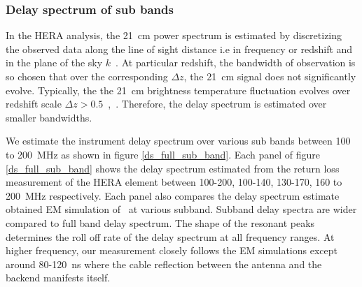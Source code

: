 \documentclass[twocolumn]{emulateapj}
\begin{document}
    \subsubsection{Delay spectrum of sub bands}
    \label{sub-band}
    In the HERA analysis, the 21~cm power spectrum
    is estimated by discretizing the observed data along the line of sight distance i.e
    in frequency or redshift and in the plane of the sky
    $k$~\citep{liu_et_al2014a}. At particular redshift, the bandwidth of
    observation is so chosen that over the corresponding $\Delta z$, the 21~cm
    signal does not significantly evolve. Typically, the the 21~cm brightness
    temperature fluctuation evolves over redshift scale $\Delta
    z>0.5$~\citep{loeb_zaldarriaga2004},~\citep{lidz_et_al2008}. Therefore, the delay
    spectrum is estimated over smaller bandwidths.
    
    We estimate the instrument
    delay spectrum over various sub bands between 100 to 200~MHz as shown in figure
    \ref{ds_full_sub_band}. Each panel of figure \ref{ds_full_sub_band} shows the
    delay spectrum estimated from the return loss measurement of the HERA element
    between 100-200, 100-140, 130-170, 160 to 200~MHz respectively. Each panel also
    compares the delay spectrum estimate obtained EM simulation of~\cite{deBoer_2016} at various subband. Subband delay spectra are wider compared to full
    band delay spectrum.  The shape of the resonant peaks determines the roll off rate
    of the delay spectrum at all frequency ranges. At higher
    frequency, our measurement closely follows the EM simulations except around
    80-120~ns where the cable reflection between the antenna and the backend manifests
    itself. 
    
\end{document}
